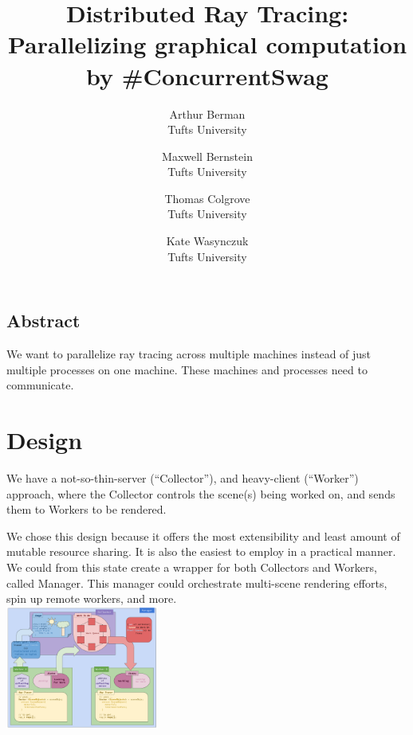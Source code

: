 \documentclass[letterpaper,twocolumn,10pt]{article}
\begin{document}
\date{}

\title{\Large \bf Distributed Ray Tracing: Parallelizing graphical computation\\
  \small \normalfont by \#ConcurrentSwag}

\newcommand{\tuftsauthor}[1]{{\rm #1}\\
  Tufts University}

\author{
  \tuftsauthor{Arthur Berman}
  \and
  \tuftsauthor{Maxwell Bernstein}
  \and
  \tuftsauthor{Thomas Colgrove}
  \and
  \tuftsauthor{Kate Wasynczuk}
}

\maketitle



\subsection*{Abstract}
We want to parallelize ray tracing across multiple machines instead of just
multiple processes on one machine. These machines and processes need to
communicate.

\section{Design}

We have a not-so-thin-server (``Collector''), and heavy-client (``Worker'')
approach, where the Collector controls the scene(s) being worked on, and sends
them to Workers to be rendered.

We chose this design because it offers the most extensibility and least amount
of mutable resource sharing. It is also the easiest to employ in a practical
manner. We could from this state create a wrapper for both Collectors and
Workers, called Manager. This manager could orchestrate multi-scene rendering
efforts, spin up remote workers, and more.\\ %

\includegraphics[width=190px]{obj-diagram.png}
\end{document}
